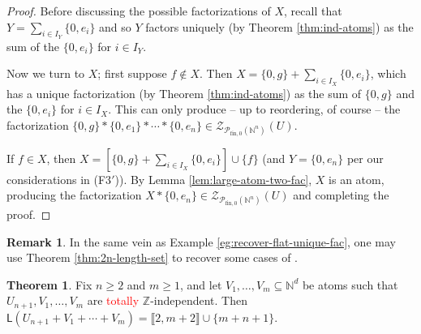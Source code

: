 \documentclass{report}
\newcommand{\NN}{\mathbb{N}}
\renewcommand{\P}{\mathcal{P}}
\newcommand{\ZZ}{\mathbb{Z}}
\newcommand{\Z}{\mathcal{Z}}
\newcommand{\llb}{\llbracket}
\newcommand{\rrb}{\rrbracket}
\newcommand{\fon}{{\textrm{fin}, 0}}
\renewcommand{\:}{\text{:}}
\theoremstyle{definition}
\newtheorem{thm}[defn]{Theorem}
\newtheorem{rk}[defn]{Remark}
\begin{document}
\begin{proof}
Before discussing the possible factorizations of $X$, recall that $Y = \sum_{i\in I_Y} \{0,e_i\}$ and so $Y$ factors uniquely (by Theorem \ref{thm:ind-atoms}) as the sum of the $\{0,e_i\}$ for $i\in I_Y$.

Now we turn to $X$; first suppose $f\notin X$.
Then $X = \{0,g\} +\sum_{i\in I_X} \{0,e_i\}$, which has a unique factorization (by Theorem \ref{thm:ind-atoms}) as the sum of $\{0,g\}$ and the $\{0,e_i\}$ for $i\in I_X$.
This can only produce -- up to reordering, of course -- the factorization $\{0,g\}*\{0,e_1\}*\cdots*\{0,e_n\}\in \Z_{\P_\fon(\NN^n)}(U)$.

If $f\in X$, then $X = \left[\{0,g\}+\sum_{i\in I_X} \{0,e_i\} \right]\cup\{f\}$ (and $Y = \{0,e_n\}$ per our considerations in (F3$'$)).
By Lemma \ref{lem:large-atom-two-fac}, $X$ is an atom, producing the factorization $X*\{0,e_n\}\in \Z_{\P_\fon(\NN^n)}(U)$ and completing the proof.
\end{proof}


\begin{rk}
In the same vein as Example \ref{eg:recover-flat-unique-fac}, one may use Theorem \ref{thm:2n-length-set} to recover some cases of \cite[Proposition 4.8]{fan-tringali18}.
\end{rk}


\begin{thm} \label{thm:int-point-construction}
Fix $n\ge 2$ and $m\ge 1$, and let $V_1,\dots, V_m \subseteq \NN^d$ be atoms such that $U_{n+1},V_1,\dots, V_m$ are \textcolor{red}{totally} $\ZZ$-independent.
Then $\mathsf{L}(U_{n+1}+V_1+\cdots+V_m) = \llb 2,m+2 \rrb \cup \{m+n+1\}$.
\end{thm}
\end{document}
